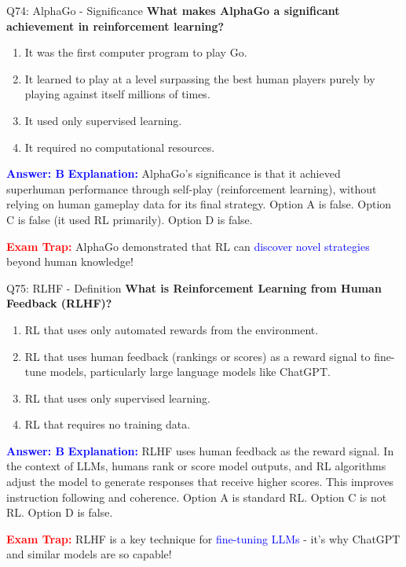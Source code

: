 \documentclass[8pt]{beamer}
\begin{document}
	\begin{frame}{Q74: AlphaGo - Significance}
		\fontsize{6.5}{7.5}\selectfont
		\textbf{What makes AlphaGo a significant achievement in reinforcement learning?}
		
		\begin{enumerate}
			\item It was the first computer program to play Go.
			\item It learned to play at a level surpassing the best human players purely by playing against itself millions of times.
			\item It used only supervised learning.
			\item It required no computational resources.
		\end{enumerate}
		
		\vspace{0.1cm}
		\textcolor{blue}{\textbf{Answer: B}}
		\vspace{0.1cm}
		\textcolor{blue}{\textbf{Explanation:}} AlphaGo's significance is that it achieved superhuman performance through self-play (reinforcement learning), without relying on human gameplay data for its final strategy. Option A is false. Option C is false (it used RL primarily). Option D is false.
		
		\textcolor{red}{\textbf{Exam Trap:}} AlphaGo demonstrated that RL can \textcolor{blue}{discover novel strategies} beyond human knowledge!
	\end{frame}
	
	\begin{frame}{Q75: RLHF - Definition}
		\fontsize{6.5}{7.5}\selectfont
		\textbf{What is Reinforcement Learning from Human Feedback (RLHF)?}
		
		\begin{enumerate}
			\item RL that uses only automated rewards from the environment.
			\item RL that uses human feedback (rankings or scores) as a reward signal to fine-tune models, particularly large language models like ChatGPT.
			\item RL that uses only supervised learning.
			\item RL that requires no training data.
		\end{enumerate}
		
		\vspace{0.1cm}
		\textcolor{blue}{\textbf{Answer: B}}
		\vspace{0.1cm}
		\textcolor{blue}{\textbf{Explanation:}} RLHF uses human feedback as the reward signal. In the context of LLMs, humans rank or score model outputs, and RL algorithms adjust the model to generate responses that receive higher scores. This improves instruction following and coherence. Option A is standard RL. Option C is not RL. Option D is false.
		
		\textcolor{red}{\textbf{Exam Trap:}} RLHF is a key technique for \textcolor{blue}{fine-tuning LLMs} - it's why ChatGPT and similar models are so capable!
	\end{frame}
	
\end{document}
